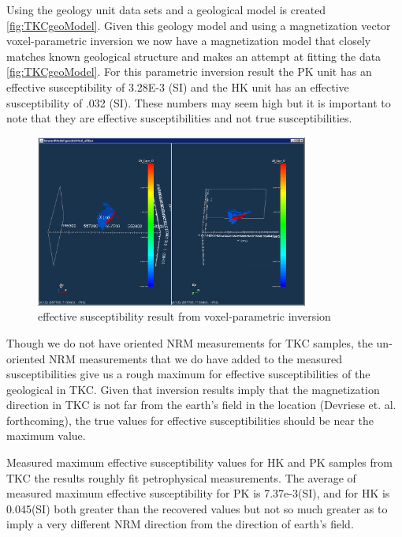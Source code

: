 Using the geology unit data sets and a geological model is created \autoref{fig:TKCgeoModel}. Given this geology model and using a magnetization vector voxel-parametric inversion we now have a magnetization model that closely matches known geological structure and makes an attempt at fitting the data \autoref{fig:TKCgeoModel}. For this parametric inversion result the PK unit has an effective susceptibility of 3.28E-3 (SI) and the HK unit has an effective susceptibility of .032 (SI). These numbers may seem high but it is important to note that they are effective susceptibilities and not true susceptibilities. 

\begin{figure} [h]
   \centering
   \includegraphics[width=0.8\textwidth]{images/TKC/TKCsuscModel.PNG}
   \caption{effective susceptibility result from voxel-parametric inversion}
   \label{fig:TKCsuscModel}
\end{figure}

Though we do not have oriented \ac{NRM} measurements for TKC samples, the un-oriented \ac{NRM} measurements that we do have added to the measured susceptibilities give us a rough maximum for effective susceptibilities of the  geological in TKC. Given that inversion results imply that the magnetization direction in TKC is not far from the earth's field in the location (Devriese et. al. forthcoming), the true  values for effective susceptibilities should be near the maximum value.

Measured maximum effective susceptibility values for HK and PK samples from TKC the results roughly fit petrophysical measurements. The average of measured maximum effective susceptibility for PK is 7.37e-3(SI), and for HK is 0.045(SI) both greater than the recovered values but not so much greater as to imply a very different \ac{NRM} direction from the direction of earth's field.

